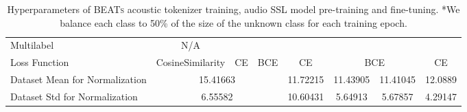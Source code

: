 \documentclass{article}
\theoremstyle{plain}
\theoremstyle{definition}
\theoremstyle{remark}
\newcommand\our{\textsc{BEATs}}
\newcommand{\cmark}{\ding{51}\xspace}\newcommand{\cmarkg}{\textcolor{lightgray}{\ding{51}}\xspace}\newcommand{\xmark}{\ding{55}\xspace}\newcommand{\xmarkg}{\textcolor{lightgray}{\ding{55}}\xspace}
\begin{document}
\begin{table}[ht]
{\begin{tabular}{l|c|c|c|c|c|c|c|c|c}
Multilabel & \multicolumn{2}{c|}{N/A} & \xmark & \multicolumn{2}{c|}{\cmark} & \xmark & \multicolumn{2}{c|}{\xmark} & \xmark \\
Loss Function & \multicolumn{2}{c|}{CosineSimilarity} & CE & \multicolumn{2}{c|}{BCE} & CE & \multicolumn{2}{c|}{BCE} & CE \\
\midrule
Dataset Mean for Normalization  & \multicolumn{5}{c|}{15.41663} & 11.72215 & 11.43905 & 11.41045 & 12.0889 \\
Dataset Std for Normalization & \multicolumn{5}{c|}{6.55582} & 10.60431 & 5.64913 & 5.67857 & 4.29147 \\
\bottomrule
\end{tabular}
}
\caption{
Hyperparameters of \our{} acoustic tokenizer training, audio SSL model pre-training and fine-tuning. 
*We balance each class to 50\% of the size of the unknown class for each training epoch.
}
\label{tbl:hyperparams}
\end{table}
\end{document}

